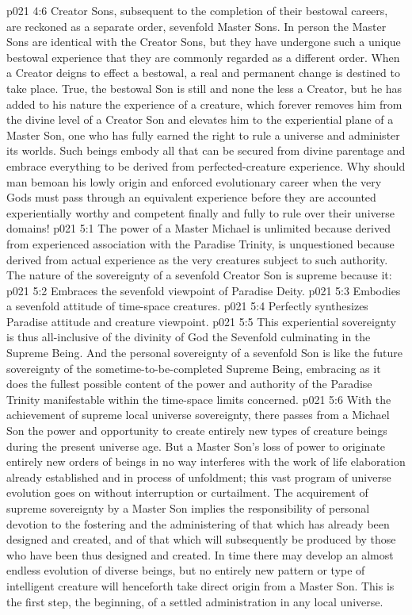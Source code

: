 \vs p021 4:6 \pc Creator Sons, subsequent to the completion of their bestowal careers, are reckoned as a separate order, sevenfold Master Sons. In person the Master Sons are identical with the Creator Sons, but they have undergone such a unique bestowal experience that they are commonly regarded as a different order. When a Creator deigns to effect a bestowal, a real and permanent change is destined to take place. True, the bestowal Son is still and none the less a Creator, but he has added to his nature the experience of a creature, which forever removes him from the divine level of a Creator Son and elevates him to the experiential plane of a Master Son, one who has fully earned the right to rule a universe and administer its worlds. Such beings embody all that can be secured from divine parentage and embrace everything to be derived from perfected\hyp{}creature experience. Why should man bemoan his lowly origin and enforced evolutionary career when the very Gods must pass through an equivalent experience before they are accounted experientially worthy and competent finally and fully to rule over their universe domains!
\vs p021 5:1 The power of a Master Michael is unlimited because derived from experienced association with the Paradise Trinity, is unquestioned because derived from actual experience as the very creatures subject to such authority. The nature of the sovereignty of a sevenfold Creator Son is supreme because it:
\vs p021 5:2 \bibnobreakspace Embraces the sevenfold viewpoint of Paradise Deity.
\vs p021 5:3 \bibnobreakspace Embodies a sevenfold attitude of time\hyp{}space creatures.
\vs p021 5:4 \bibnobreakspace Perfectly synthesizes Paradise attitude and creature viewpoint.
\vs p021 5:5 \pc This experiential sovereignty is thus all\hyp{}inclusive of the divinity of God the Sevenfold culminating in the Supreme Being. And the personal sovereignty of a sevenfold Son is like the future sovereignty of the sometime\hyp{}to\hyp{}be\hyp{}completed Supreme Being, embracing as it does the fullest possible content of the power and authority of the Paradise Trinity manifestable within the time\hyp{}space limits concerned.
\vs p021 5:6 \pc With the achievement of supreme local universe sovereignty, there passes from a Michael Son the power and opportunity to create entirely new types of creature beings during the present universe age. But a Master Son’s loss of power to originate entirely new orders of beings in no way interferes with the work of life elaboration already established and in process of unfoldment; this vast program of universe evolution goes on without interruption or curtailment. The acquirement of supreme sovereignty by a Master Son implies the responsibility of personal devotion to the fostering and the administering of that which has already been designed and created, and of that which will subsequently be produced by those who have been thus designed and created. In time there may develop an almost endless evolution of diverse beings, but no entirely new pattern or type of intelligent creature will henceforth take direct origin from a Master Son. This is the first step, the beginning, of a settled administration in any local universe.
